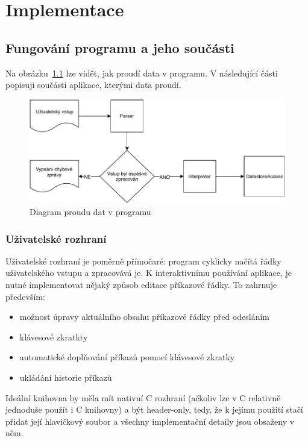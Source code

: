 \documentclass[thesis=B,czech,hidelinks]{FITthesis}[2019/03/06]
\newcommand{\Rplus}{\protect\hspace{-.1em}\protect\raisebox{.35ex}{\smaller{\smaller\textbf{+}}}}
\newcommand{\Cpp}{\mbox{C\Rplus\Rplus}\xspace}
\begin{document}
\chapter{Implementace}

\section{Fungování programu a jeho součásti}
Na obrázku~\ref{proud-dat} lze vidět, jak proudí data v programu. V následující části popisuji součásti aplikace, kterými data proudí.
\begin{figure}
\begin{center}
\includegraphics[width=.9\textwidth]{diagram}
\end{center}
\caption{Diagram proudu dat v programu}\label{proud-dat}
\end{figure}

\subsection{Uživatelské rozhraní}
Uživatelské rozhraní je poměrně přímočaré: program cyklicky načítá řádky uživatelského vstupu a zpracovává je. K interaktivnímu používání aplikace, je nutné implementovat nějaký způsob editace příkazové řádky. To zahrnuje především:
\begin{itemize}
    \item možnost úpravy aktuálního obsahu příkazové řádky před odesláním
    \item klávesové zkratkty 
    \item automatické doplňování příkazů pomocí klávesové zkratky
    \item ukládání historie příkazů
\end{itemize}
Ideální knihovna by měla mít nativní \Cpp{} rozhraní (ačkoliv lze v \Cpp{} relativně jednoduše použít i C knihovny) a být header-only, tedy, že k jejímu použití stačí přidat její hlavičkový soubor a všechny implementační detaily jsou obsaženy v něm.
\end{document}
